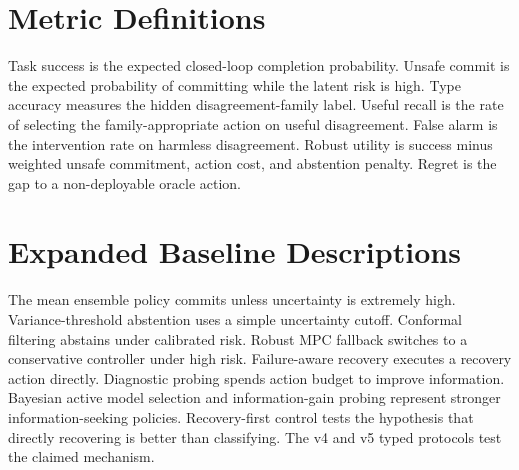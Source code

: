 \documentclass[11pt]{article}
\begin{document}
\section{Metric Definitions}
Task success is the expected closed-loop completion probability. Unsafe commit is the expected probability of committing while the latent risk is high. Type accuracy measures the hidden disagreement-family label. Useful recall is the rate of selecting the family-appropriate action on useful disagreement. False alarm is the intervention rate on harmless disagreement. Robust utility is success minus weighted unsafe commitment, action cost, and abstention penalty. Regret is the gap to a non-deployable oracle action.

\section{Expanded Baseline Descriptions}
The mean ensemble policy commits unless uncertainty is extremely high. Variance-threshold abstention uses a simple uncertainty cutoff. Conformal filtering abstains under calibrated risk. Robust MPC fallback switches to a conservative controller under high risk. Failure-aware recovery executes a recovery action directly. Diagnostic probing spends action budget to improve information. Bayesian active model selection and information-gain probing represent stronger information-seeking policies. Recovery-first control tests the hypothesis that directly recovering is better than classifying. The v4 and v5 typed protocols test the claimed mechanism.
\end{document}
